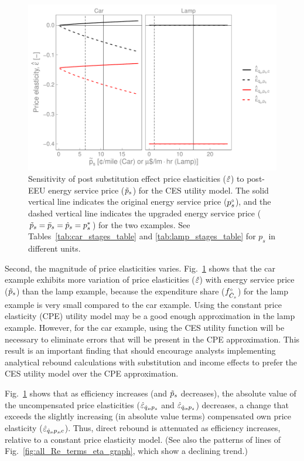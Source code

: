 \documentclass[12pt]{article}\usepackage[]{graphicx}\usepackage[]{xcolor}
\makeatletter
\def\maxwidth{ %
  \ifdim\Gin@nat@width>\linewidth
    \linewidth
  \else
    \Gin@nat@width
  \fi
}
\newenvironment{knitrout}{}{} %
\makeatother
\begin{document}
\begin{knitrout}
\color{fgcolor}\begin{figure}

{\centering \includegraphics[width=\maxwidth]{figure/PriceElasticitySensGraph-1} 

}

\caption{Sensitivity of post substitution effect price elasticities ($\hat{\varepsilon}$) to post-EEU energy service price ($\tilde{p}_{s}$) for the CES utility model. The solid vertical line indicates the original energy service price (${}{p}^{\scriptscriptstyle \circ}_s$), and the dashed vertical line indicates the upgraded energy service price ($\tilde{p}_s = \bar{p}_s = \hat{p}_s = {p}^*_s$) for the two examples. See Tables~\ref{tab:car_stages_table} and \ref{tab:lamp_stages_table} for $p_s$ in different units.}\label{fig:PriceElasticitySensGraph}
\end{figure}

\end{knitrout}


Second, the magnitude of price elasticities varies.
Fig.~\ref{fig:PriceElasticitySensGraph} shows that the car example exhibits
more variation of price elasticities ($\hat{\varepsilon}$) with energy service price ($\tilde{p}_s$)
than the lamp example, 
because the expenditure share (${}{f}^{\scriptscriptstyle \circ}_{\dot{C}_s}$) for the lamp example is very small
compared to the car example.
Using the constant price elasticity (CPE) utility model may be a
good enough approximation in the lamp example. 
However, for the car example, using the CES utility function will be necessary
to eliminate errors that will be present in the CPE approximation.
This result is an important finding that should encourage 
analysts implementing analytical rebound calculations
with substitution and income effects
to prefer the CES utility model over the CPE approximation.

Fig.~\ref{fig:PriceElasticitySensGraph} shows that
as efficiency increases (and $\tilde{p}_s$ decreases), 
the absolute value of the uncompensated price elasticities 
($\hat{\varepsilon}_{\dot{q}_s\!,p_s}$ and $\hat{\varepsilon}_{\dot{q}_o\!,p_s}$) decreases, 
a change that exceeds the slightly increasing (in absolute value terms)
compensated own price elasticity ($\hat{\varepsilon}_{\dot{q}_s\!,p_s\!,c}$). 
Thus, direct rebound is attenuated as efficiency increases,
relative to a constant price elasticity model.
(See also the patterns of lines of Fig.~\ref{fig:all_Re_terms_eta_graph},
which show a declining trend.)
\end{document}

